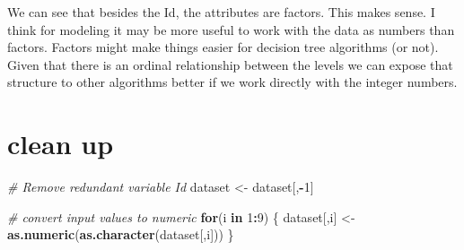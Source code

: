 \documentclass[]{book}
\newenvironment{Shaded}{\begin{snugshade}}{\end{snugshade}}
\newcommand{\CommentTok}[1]{\textcolor[rgb]{0.56,0.35,0.01}{\textit{#1}}}
\newcommand{\ControlFlowTok}[1]{\textcolor[rgb]{0.13,0.29,0.53}{\textbf{#1}}}
\newcommand{\DecValTok}[1]{\textcolor[rgb]{0.00,0.00,0.81}{#1}}
\newcommand{\KeywordTok}[1]{\textcolor[rgb]{0.13,0.29,0.53}{\textbf{#1}}}
\newcommand{\NormalTok}[1]{#1}
\newcommand{\OperatorTok}[1]{\textcolor[rgb]{0.81,0.36,0.00}{\textbf{#1}}}
\newcommand{\StringTok}[1]{\textcolor[rgb]{0.31,0.60,0.02}{#1}}
\begin{document}
\begin{Shaded}
\end{Shaded}

We can see that besides the Id, the attributes are factors. This makes sense. I
think for modeling it may be more useful to work with the data as numbers than
factors. Factors might make things easier for decision tree algorithms (or not).
Given that there is an ordinal relationship between the levels we can expose
that structure to other algorithms better if we work directly with the integer
numbers.

\hypertarget{clean-up}{%
\section{clean up}\label{clean-up}}

\begin{Shaded}
\begin{Highlighting}[]
\CommentTok{# Remove redundant variable Id}
\NormalTok{dataset <-}\StringTok{ }\NormalTok{dataset[,}\OperatorTok{-}\DecValTok{1}\NormalTok{]}
\end{Highlighting}
\end{Shaded}

\begin{Shaded}
\begin{Highlighting}[]
\CommentTok{# convert input values to numeric}
\ControlFlowTok{for}\NormalTok{(i }\ControlFlowTok{in} \DecValTok{1}\OperatorTok{:}\DecValTok{9}\NormalTok{) \{}
\NormalTok{    dataset[,i] <-}\StringTok{ }\KeywordTok{as.numeric}\NormalTok{(}\KeywordTok{as.character}\NormalTok{(dataset[,i]))}
\NormalTok{\}}
\end{Highlighting}
\end{Shaded}
\end{document}
